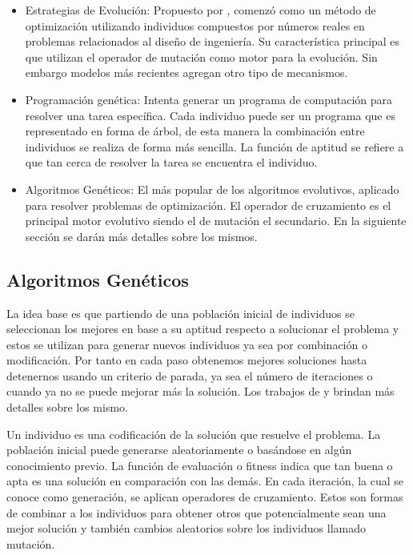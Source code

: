 \begin{itemize}

	\item Estrategias de Evolución: Propuesto por \citet{Ingo1971}, comenzó como un método de optimización utilizando individuos compuestos por números reales en problemas relacionados al diseño de ingeniería. Su característica principal es que utilizan el operador de mutación como motor para la evolución. Sin embargo modelos más recientes agregan otro tipo de mecanismos.
	\item Programación genética: Intenta generar un programa de computación para resolver una tarea específica. Cada individuo puede ser un programa que es representado en forma de árbol, de esta manera la combinación entre individuos se realiza de forma más sencilla. La función de aptitud se refiere a que tan cerca de resolver la tarea se encuentra el individuo.\citep{Koza1992}
	\item Algoritmos Genéticos: El más popular de los algoritmos evolutivos, aplicado para resolver problemas de optimización. El operador de cruzamiento es el principal motor evolutivo siendo el de mutación el secundario. En la siguiente sección se darán más detalles sobre los mismos.
\end{itemize}

\subsection{Algoritmos Genéticos}
La idea base es que partiendo de una población inicial de individuos se seleccionan los mejores en base a su aptitud respecto a solucionar el problema y estos se utilizan para generar nuevos individuos ya sea por combinación o modificación. Por tanto en cada paso obtenemos mejores soluciones hasta detenernos usando un criterio de parada, ya sea el número de iteraciones o cuando ya no se puede mejorar más la solución. Los trabajos de \citet{Goldberg1989} y \citet{Mitchell1996} brindan más detalles sobre los mismo.

Un individuo es una codificación de la solución que resuelve el problema. La población inicial puede generarse aleatoriamente o basándose en algún conocimiento previo. La función de evaluación o fitness indica que tan buena o apta es una solución en comparación con las demás.
En cada iteración, la cual se conoce como generación, se aplican operadores de cruzamiento. Estos son formas de combinar a los individuos para obtener otros que potencialmente sean una mejor solución y también cambios aleatorios sobre los individuos llamado mutación.


